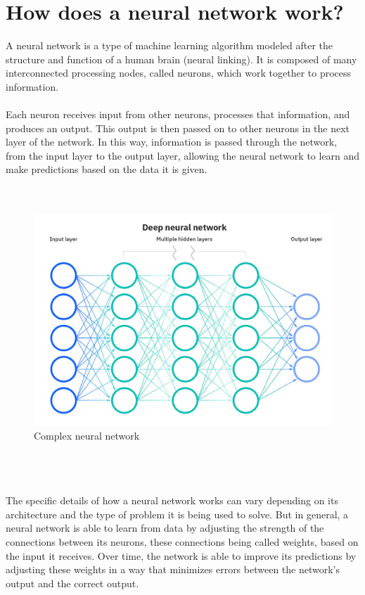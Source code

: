 \section{How does a neural network work?}
A neural network is a type of machine learning algorithm modeled after the structure and function of a human brain (neural linking). It is composed of many interconnected processing nodes, called neurons, which work together to process information. 
\\
\\
Each neuron receives input from other neurons, processes that information, and produces an output. This output is then passed on to other neurons in the next layer of the network. In this way, information is passed through the network, from the input layer to the output layer, allowing the neural network to learn and make predictions based on the data it is given.
\\
\\
\\
\begin{figure}[htb]
    \includegraphics[width=1\textwidth]{pics/neuralnetwork.jpg}
    \caption{Complex neural network}
\end{figure}
\\
\\
\\
The specific details of how a neural network works can vary depending on its architecture and the type of problem it is being used to solve. But in general, a neural network is able to learn from data by adjusting the strength of the connections between its neurons, these connections being called weights, based on the input it receives. Over time, the network is able to improve its predictions by adjusting these weights in a way that minimizes errors between the network's output and the correct output.

